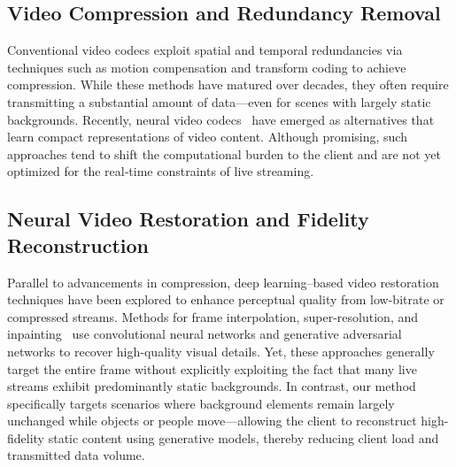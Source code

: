 \subsection{Video Compression and Redundancy Removal}
Conventional video codecs exploit spatial and temporal redundancies via techniques such as motion compensation and transform coding to achieve compression. 
While these methods have matured over decades, they often require transmitting a substantial amount of data—even for scenes with largely static backgrounds. 
Recently, neural video codecs~\cite{NeRV, HNeRV} have emerged as alternatives that learn compact representations of video content. 
Although promising, such approaches tend to shift the computational burden to the client and are not yet optimized for the real‐time constraints of live streaming.

\subsection{Neural Video Restoration and Fidelity Reconstruction}
Parallel to advancements in compression, deep learning–based video restoration techniques have been explored to enhance perceptual quality from low-bitrate or compressed streams. 
Methods for frame interpolation, super-resolution, and inpainting~\cite{ELVIS} use convolutional neural networks and generative adversarial networks to recover high-quality visual details. 
Yet, these approaches generally target the entire frame without explicitly exploiting the fact that many live streams exhibit predominantly static backgrounds. 
In contrast, our method specifically targets scenarios where background elements remain largely unchanged while objects or people move—allowing the client to reconstruct high-fidelity static content using generative models, thereby reducing client load and transmitted data volume.

